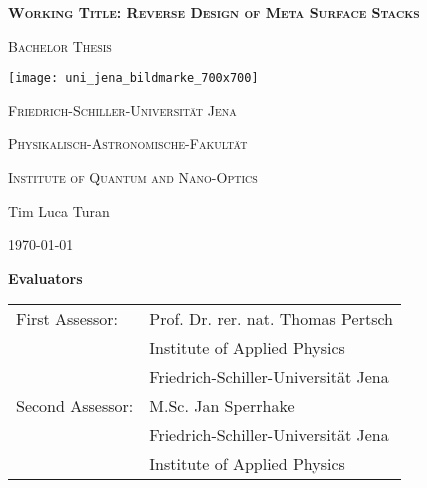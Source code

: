 \begin{titlepage}
	\centering

	{\scshape\Large \textbf{Working Title: Reverse Design of Meta Surface Stacks} \par}
	\vspace{1cm}
	{\scshape\Large Bachelor Thesis \par}
	\vspace{1.5cm}
	\texttt{[image: uni\_jena\_bildmarke\_700x700]}\par
	{\huge\bfseries \par}
	\vspace{10cm}
	{\scshape\large Friedrich-Schiller-Universität Jena\par}
	{\scshape\large Physikalisch-Astronomische-Fakultät\par}
	{\scshape\large Institute of Quantum and Nano-Optics\par}
	\vfill
	{\Large Tim Luca Turan}

	\vfill

	{\large \today\par}
\end{titlepage}

\thispagestyle{empty}
\vspace*{\fill}
\textbf{\Large Evaluators}\\[1.5cm]

\begin{tabular}{ll}
First Assessor: & Prof. Dr. rer. nat. Thomas Pertsch\\
 & Institute of Applied Physics \\
 & Friedrich-Schiller-Universität Jena \\
Second Assessor: & M.Sc. Jan Sperrhake \\
 & Friedrich-Schiller-Universität Jena \\
 & Institute of Applied Physics \\
\end{tabular}
